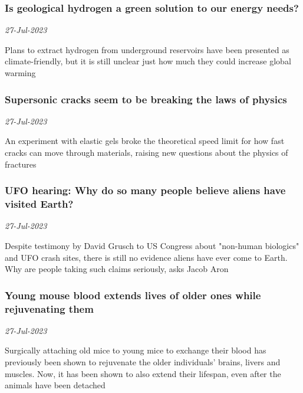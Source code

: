 \subsubsection{Is geological hydrogen a green solution to our energy needs? \href{https://www.newscientist.com/article/2384933-is-geological-hydrogen-a-green-solution-to-our-energy-needs/?utm_campaign=RSS%7CNSNS&utm_source=NSNS&utm_medium=RSS&utm_content=home}{}}
\textit{27-Jul-2023}

Plans to extract hydrogen from underground reservoirs have been presented as climate-friendly, but it is still unclear just how much they could increase global warming
\subsubsection{Supersonic cracks seem to be breaking the laws of physics \href{https://www.newscientist.com/article/2384843-supersonic-cracks-seem-to-be-breaking-the-laws-of-physics/?utm_campaign=RSS%7CNSNS&utm_source=NSNS&utm_medium=RSS&utm_content=home}{\ding{225}}}
\textit{27-Jul-2023}

An experiment with elastic gels broke the theoretical speed limit for how fast cracks can move through materials, raising new questions about the physics of fractures
\subsubsection{UFO hearing: Why do so many people believe aliens have visited Earth? \href{https://www.newscientist.com/article/2384991-ufo-hearing-why-do-so-many-people-believe-aliens-have-visited-earth/?utm_campaign=RSS%7CNSNS&utm_source=NSNS&utm_medium=RSS&utm_content=home}{}}
\textit{27-Jul-2023}

Despite testimony by David Grusch to US Congress about "non-human biologics" and UFO crash sites, there is still no evidence aliens have ever come to Earth. Why are people taking such claims seriously, asks Jacob Aron
\subsubsection{Young mouse blood extends lives of older ones while rejuvenating them \href{https://www.newscientist.com/article/2384878-young-mouse-blood-extends-lives-of-older-ones-while-rejuvenating-them/?utm_campaign=RSS%7CNSNS&utm_source=NSNS&utm_medium=RSS&utm_content=home}{\ding{225}}}
\textit{27-Jul-2023}

Surgically attaching old mice to young mice to exchange their blood has previously been shown to rejuvenate the older individuals' brains, livers and muscles. Now, it has been shown to also extend their lifespan, even after the animals have been detached
